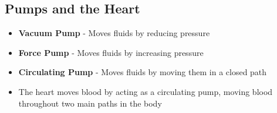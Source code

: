 \subsection{Pumps and the Heart}
\begin{itemize}
    \item \textbf{Vacuum Pump} - Moves fluids by reducing pressure
    \item \textbf{Force Pump} - Moves fluids by increasing pressure
    \item \textbf{Circulating Pump} - Moves fluids by moving them in a closed path
    \item The heart moves blood by acting as a circulating pump, moving blood throughout two main paths in the body
\end{itemize}

\newpage